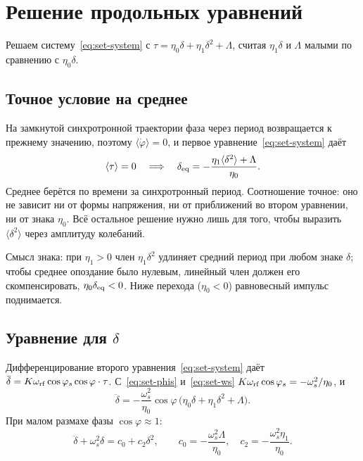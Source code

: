 \section{Решение продольных уравнений}
\label{sec:sol}

Решаем систему~\eqref{eq:set-system} с $\tau=\eta_0\delta+\eta_1\delta^2+\Lambda$, считая $\eta_1\delta$ и $\Lambda$ малыми по сравнению с $\eta_0\delta$.

\subsection{Точное условие на среднее}

На замкнутой синхротронной траектории фаза через период возвращается к прежнему значению, поэтому $\langle\dot\varphi\rangle=0$, и первое уравнение~\eqref{eq:set-system} даёт
\begin{equation}
\label{eq:sol-mean}
\langle\tau\rangle=0
\quad\Longrightarrow\quad
\delta_{\mathrm{eq}}=-\frac{\eta_1\langle\delta^2\rangle+\Lambda}{\eta_0}.
\end{equation}
Среднее берётся по времени за синхротронный период. Соотношение точное: оно не зависит ни от формы напряжения, ни от приближений во втором уравнении, ни от знака $\eta_0$. Всё остальное решение нужно лишь для того, чтобы выразить $\langle\delta^2\rangle$ через амплитуду колебаний.

Смысл знака: при $\eta_1>0$ член $\eta_1\delta^2$ удлиняет средний период при любом знаке $\delta$; чтобы среднее опоздание было нулевым, линейный член должен его скомпенсировать, $\eta_0\delta_{\mathrm{eq}}<0$. Ниже перехода ($\eta_0<0$) равновесный импульс поднимается.

\subsection{Уравнение для $\delta$}

Дифференцирование второго уравнения~\eqref{eq:set-system} даёт $\ddot\delta=K\omega_{\mathrm{rf}}\cos\varphi_s\cos\varphi\cdot\tau$. С~\eqref{eq:set-phis} и~\eqref{eq:set-ws} $K\omega_{\mathrm{rf}}\cos\varphi_s=-\omega_s^2/\eta_0$, и
\begin{equation}
\label{eq:sol-exact}
\ddot\delta=-\frac{\omega_s^2}{\eta_0}\cos\varphi\,\bigl(\eta_0\delta+\eta_1\delta^2+\Lambda\bigr).
\end{equation}
При малом размахе фазы $\cos\varphi\approx 1$:
\begin{equation}
\label{eq:sol-reduced}
\ddot\delta+\omega_s^2\delta=c_0+c_2\delta^2,
\qquad
c_0=-\frac{\omega_s^2\Lambda}{\eta_0},
\quad
c_2=-\frac{\omega_s^2\eta_1}{\eta_0}.
\end{equation}

